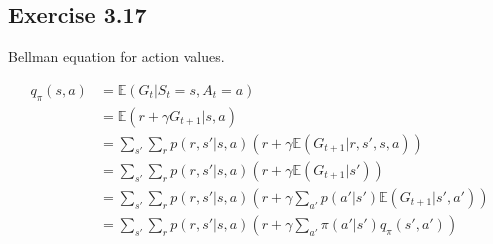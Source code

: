 \documentclass[12pt]{amsart}
\begin{document}
\subsection*{Exercise 3.17} 

Bellman equation for action values.

\begin{align*}
q_{\pi}(s,a) &= \mathbb{E}(G_t|S_t=s, A_t=a) \\
	&= \mathbb{E}(r + \gamma G_{t+1} | s, a) \\
	& = \sum_{s'} \sum_r p(r, s' | s,a) \left( r + \gamma \mathbb{E}(G_{t+1}|r, s', s, a) \right)  \\ 
	& = \sum_{s'} \sum_r p(r, s' | s,a) \left( r + \gamma \mathbb{E}(G_{t+1}|s') \right)  \\ 
	& = \sum_{s'} \sum_r p(r, s' | s,a) \left( r + \gamma \sum_{a'} p(a'|s') \mathbb{E}(G_{t+1}|s', a') \right)  \\ 
	&= \sum_{s'}  \sum_r p(r, s' | s,a) \left(r + \gamma \sum_{a'} \pi(a'|s') q_{\pi}(s', a') \right)
\end{align*}
\end{document}
